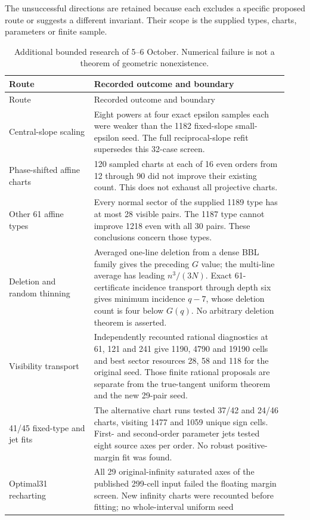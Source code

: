 The unsuccessful directions are retained because each excludes a
specific proposed route or suggests a different invariant. Their
scope is the supplied types, charts, parameters or finite sample.
\begin{longtable}{@{}P{0.29\linewidth}P{0.64\linewidth}@{}}
\caption{Additional bounded research of 5--6 October. Numerical failure
is not a theorem of geometric nonexistence.}\label{exp:bounded-five-table}\\
\toprule Route & Recorded outcome and boundary\\\midrule\endfirsthead
\toprule Route & Recorded outcome and boundary\\\midrule\endhead
\bottomrule\endfoot
Central-slope scaling & Eight powers at four exact epsilon samples each
were weaker than the 1182 fixed-slope small-epsilon seed. The full
reciprocal-slope refit supersedes this 32-case screen.\\
Phase-shifted affine charts & 120 sampled charts at each of 16 even
orders from 12 through 90 did not improve their existing count. This
does not exhaust all projective charts.\\
Other 61 affine types & Every normal sector of the supplied 1189 type
has at most 28 visible pairs. The 1187 type cannot improve 1218 even
with all 30 pairs. These conclusions concern those types.\\
Deletion and random thinning & Averaged one-line deletion from a dense
BBL family gives the preceding $G$ value; the multi-line average has
leading $n^3/(3N)$. Exact 61-certificate incidence transport through
depth six gives minimum incidence $q-7$, whose deletion count is four
below $G(q)$. No arbitrary deletion theorem is asserted.\\
Visibility transport & Independently recounted rational diagnostics at
61, 121 and 241 give 1190, 4790 and 19190 cells and best sector resources
28, 58 and 118 for the original seed. Those finite rational proposals
are separate from the true-tangent uniform theorem and the new 29-pair seed.\\
41/45 fixed-type and jet fits & The alternative chart runs tested
37/42 and 24/46 charts, visiting 1477 and 1059 unique sign cells.
First- and second-order parameter jets tested eight source axes per
order. No robust positive-margin fit was found.\\
Optimal31 recharting & All 29 original-infinity saturated axes of the
published 299-cell input failed the floating margin screen. New infinity
charts were recounted before fitting; no whole-interval uniform seed

\end{longtable}
